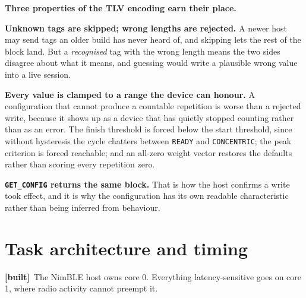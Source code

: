 \documentclass[11pt]{article}
\newcommand{\built}{{\sffamily\scriptsize\color{good}\textbf{[built]}}\ }
\begin{document}
\begin{callout}
\textbf{Three properties of the TLV encoding earn their place.}

\medskip
\textbf{Unknown tags are skipped; wrong lengths are rejected.} A newer host
may send tags an older build has never heard of, and skipping lets the rest of
the block land. But a \emph{recognised} tag with the wrong length means the
two sides disagree about what it means, and guessing would write a plausible
wrong value into a live session.

\medskip
\textbf{Every value is clamped to a range the device can honour.} A
configuration that cannot produce a countable repetition is worse than a
rejected write, because it shows up as a device that has quietly stopped
counting rather than as an error. The finish threshold is forced below the
start threshold, since without hysteresis the cycle chatters between
\texttt{READY} and \texttt{CONCENTRIC}; the peak criterion is forced
reachable; and an all-zero weight vector restores the defaults rather than
scoring every repetition zero.

\medskip
\textbf{\texttt{GET\_CONFIG} returns the same block.} That is how the host
confirms a write took effect, and it is why the configuration has its own
readable characteristic rather than being inferred from behaviour.
\end{callout}

\section{Task architecture and timing}

\built The NimBLE host owns core 0. Everything latency-sensitive goes on core
1, where radio activity cannot preempt it.
\end{document}
